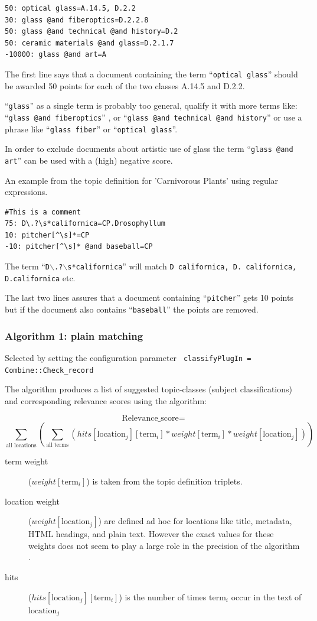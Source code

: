 \begin{verbatim}
50: optical glass=A.14.5, D.2.2
30: glass @and fiberoptics=D.2.2.8
50: glass @and technical @and history=D.2
50: ceramic materials @and glass=D.2.1.7
-10000: glass @and art=A
\end{verbatim}

The first line says that a document containing the term ``{\tt optical
glass}'' should be awarded 50 points for each of the two classes A.14.5 and
D.2.2.

``{\tt glass}'' as a single term is probably too general, qualify it with more terms
  like: ``{\tt glass @and fiberoptics}'' , or ``{\tt glass @and technical @and history}''
  or  use a phrase like ``{\tt glass fiber}'' or ``{\tt optical glass}''.

  In order to exclude documents about artistic use of glass the term 
  ``{\tt glass @and art}'' can be used with a (high) negative score.

An example from the topic definition for 'Carnivorous Plants' using
  regular expressions. 
\begin{verbatim}
#This is a comment
75: D\.?\s*californica=CP.Drosophyllum
10: pitcher[^\s]*=CP
-10: pitcher[^\s]* @and baseball=CP
\end{verbatim}
The term ``{\tt D$\backslash$.?$\backslash$s*californica}''
 will match {\tt D californica, D. californica, D.californica} etc.

The last two lines assures that a document containing ``{\tt pitcher}'' gets
10 points but if the document also contains ``{\tt baseball}'' the points are removed.

\subsubsection{Algorithm 1: plain matching}
\label{std}

Selected by setting the configuration parameter {\tt 
classifyPlugIn = Combine::Check\_record}

The algorithm produces a list of suggested topic-classes (subject classifications) and
corresponding relevance scores using the algorithm:

\vbox{
\[ \mbox{Relevance\_score} = \]
\[ \sum_{\mbox{all locations}} \left( \sum_{\mbox{all terms}} (hits[\mbox{location}_{j}][\mbox{term
}_{i}] * weight[\mbox{term}_{i}] * weight[\mbox{location}_{j}]) \right) \]}

\begin{description}
\item[term weight] ($weight[\mbox{term}_{i}]$) is taken from the topic definition
triplets. 
\item[location weight] ($weight[\mbox{location}_{j}]$) are
defined ad hoc for locations like title, metadata, HTML headings, and plain
text. However the exact values for these weights does not seem to play
a large role in the precision of the algorithm \cite{ardo05:_ECDL}.
\item[hits] ($hits[\mbox{location}_{j}][\mbox{term}_{i}]$) is the
number of times $\mbox{term}_{i}$ occur in the text of $\mbox{location}_{j}$
\end{description}

